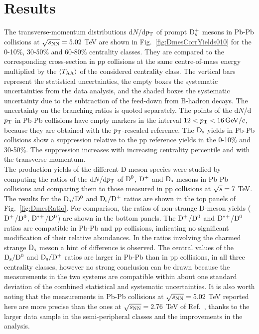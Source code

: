 \section{Results}
\label{sec:PbPbResults}
The transverse-momentum distributions d$N$/d$p_{\rm T}$ of prompt ${\rm D_s^+}$ mesons in Pb-Pb
collisions at $\sqrt{s_{\rm NN}}=5.02$ TeV are shown in Fig.~\ref{fig:DmesCorrYields010}
for the 0-10\%, 30-50\% and 60-80\% centrality classes. 
They are compared to the corresponding cross-section in pp collisions at the same centre-of-mass energy
multiplied by the $\langle T_{\rm AA} \rangle$ of the considered centrality class.
The vertical bars represent the statistical uncertainties, the empty boxes
the systematic uncertainties from the data analysis, and the shaded boxes
the systematic uncertainty due to the subtraction of the feed-down from 
B-hadron decays. The uncertainty on the branching ratios is quoted separately.
The points of the d$N$/d$p_{\rm T}$ in Pb-Pb collisions have empty markers in the interval $12 < p_{\rm T} < 16 \, \mathrm{GeV}/c$,
because they are obtained with the $p_{\rm T}$-rescaled reference.
The ${\rm D_s}$ yields in Pb-Pb collisions show a suppression relative to the pp reference
yields in the 0-10\% and 30-50\%. The suppression increases with increasing centrality percentile
and with the transverse momentum.\\


The production yields of the different D-meson species were studied by computing
the ratios of the d$N$/d$p_{\rm T}$ of ${\rm D^0}$, ${\rm D^+}$ and ${\rm D_s}$ mesons in Pb-Pb collisions
and comparing them to those measured in pp collisions at $\sqrt{s} = 7 $ TeV.
The results for the ${\rm D_s}/{\rm D^0}$ and ${\rm D_s}/{\rm D^+}$ ratios are shown in the top panels of
Fig.~\ref{fig:DmesRatio}. For comparison, the ratios of 
non-strange D-meson yields (${\rm D^+}$/${\rm D^0}$, ${\rm D^{*+}}$/${\rm D^0}$) are shown in the bottom panels.
The ${\rm D^+}$/${\rm D^0}$ and ${\rm D^{*+}}$/${\rm D^0}$ ratios are compatible in Pb-Pb and pp collisions, 
indicating no significant modification of their relative abundances. 
In the ratios involving the charmed strange ${\rm D_s}$ meson a hint of difference is observed.
The central values of the ${\rm D_s}/{\rm D^0}$ and ${\rm D_s}/{\rm D^+}$ ratios are larger in Pb-Pb than in pp collisions, 
in all three centrality classes, however no strong conclusion can be drawn because the measurements in the two systems 
are compatible within about one standard deviation of the combined statistical and systematic uncertainties.
It is also worth noting that the measurements in Pb-Pb collisions at $\sqrt{s_{\rm NN}} = 5.02$ TeV reported
here are more precise than the ones at $\sqrt{s_{\rm NN}} = 2.76$ TeV of Ref.~\cite{Adam:2015jda}, thanks to the larger
data sample in the semi-peripheral classes and the improvements in the analysis.\\

